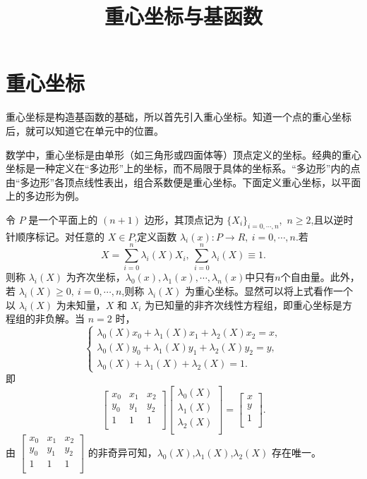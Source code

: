 \documentclass[12pt,a4paper]{article}
\title{重心坐标与基函数}
\author{}
\date{\chntoday}
\begin{document}
\maketitle

\section{重心坐标}
重心坐标是构造基函数的基础，所以首先引入重心坐标。知道一个点的重心坐标后，就可以知道它在单元中的位置。

数学中，重心坐标是由单形（如三角形或四面体等）顶点定义的坐标。经典的重心坐标是一种定义在“多边形”上的坐标，而不局限于具体的坐标系。“多边形”内的点由“多边形”各顶点线性表出，组合系数便是重心坐标。下面定义重心坐标，以平面上的多边形为例。

令 $P$ 是一个平面上的 $(n+1)$ 边形，其顶点记为 $\lbrace X_i\rbrace_{i=0,\cdots,n}$,~$n\ge 2$,且以逆时针顺序标记。对任意的 $X\in P$,定义函数 $\lambda _i(x):P\longrightarrow R,~i=0,\cdots,n$.若
$$
X=\sum_{i=0}^n \lambda _i(X)X_i,~\sum_{i=0}^n\lambda _i(X)\equiv 1.
$$
则称 $\lambda _i(X)$ 为齐次坐标，$\lambda _0(x),\lambda _1(x),\cdots,\lambda _n(x)$中只有$n$个自由量。此外，若 $\lambda _i(X)\ge 0,~i=0,\cdots,n$,则称 $\lambda _i(X)$ 为重心坐标。显然可以将上式看作一个以 $\lambda _i(X)$ 为未知量，$X$ 和 $X_i$ 为已知量的非齐次线性方程组，即重心坐标是方程组的非负解。当 $n=2$ 时，
$$
\begin{cases}
\lambda _0(X)x_0+\lambda _1(X)x_1+\lambda _2(X)x_2=x,\\
\lambda _0(X)y_0+\lambda _1(X)y_1+\lambda _2(X)y_2=y,\\
\lambda _0(X)+\lambda _1(X)+\lambda _2(X)=1.
\end{cases}
$$
即
$$
\begin{bmatrix}
x_0 & x_1 & x_2\\
y_0 & y_1 & y_2\\
1 & 1 & 1\\
\end{bmatrix}
\begin{bmatrix}
\lambda _0(X)\\
\lambda _1(X)\\
\lambda _2(X)\\
\end{bmatrix}=\begin{bmatrix}
x\\
y\\
1\\
\end{bmatrix}.
$$
由 $\begin{bmatrix}
x_0 & x_1 & x_2\\
y_0 & y_1 & y_2\\
1 & 1 & 1\\
\end{bmatrix}$ 的非奇异可知，$\lambda _0(X)$,$\lambda _1(X)$,$\lambda _2(X)$ 存在唯一。
\end{document}
